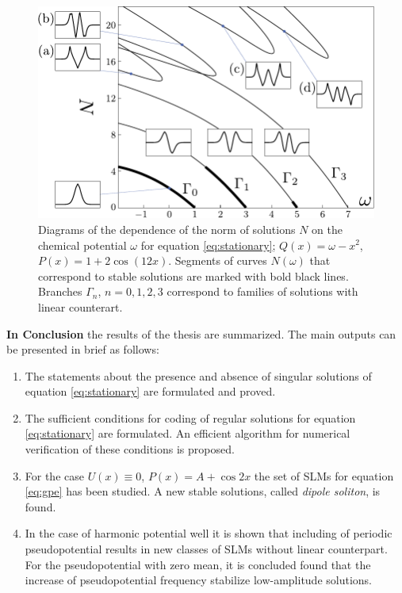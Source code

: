 \documentclass[candidate, href, colorlinks]{disser}
\begin{document}
\begin{figure}[h]
\centering
	\includegraphics[scale = 1]{pic/branches}
	\caption{
		Diagrams of the dependence of the norm of solutions $N$ on the chemical potential $\omega$ for equation \eqref{eq:stationary}; $Q(x) = \omega - x^2$, $P(x) = 1 + 2 \cos (12 x)$.
		Segments of curves $N(\omega)$ that correspond to stable solutions are marked with bold black lines.
		Branches $\Gamma_n$, $n = 0, 1, 2, 3$ correspond to families of solutions with linear counterart.
	}
\label{fig:branches}
\end{figure}


\textbf{In Conclusion} the results of the thesis are summarized.
The main outputs can be presented in brief as follows: 
\begin{enumerate}
	\item The statements about the presence and absence of singular solutions of equation \eqref{eq:stationary} are formulated and proved.
	\item The sufficient conditions for coding of regular solutions for equation \eqref{eq:stationary} are formulated.
	An efficient algorithm for numerical verification of these conditions is proposed.
	\item For the case $U(x) \equiv 0$, $P(x) = A + \cos 2x$ the set of SLMs for equation \eqref{eq:gpe} has been studied.
	A new stable solutions, called {\it dipole soliton}, is found.
	\item In the case of harmonic potential well it is shown that including of periodic pseudopotential results in new classes of SLMs without linear counterpart.
		For the pseudopotential with zero mean, it is concluded found that the increase of pseudopotential frequency stabilize low-amplitude solutions.
\end{enumerate}
\end{document}
